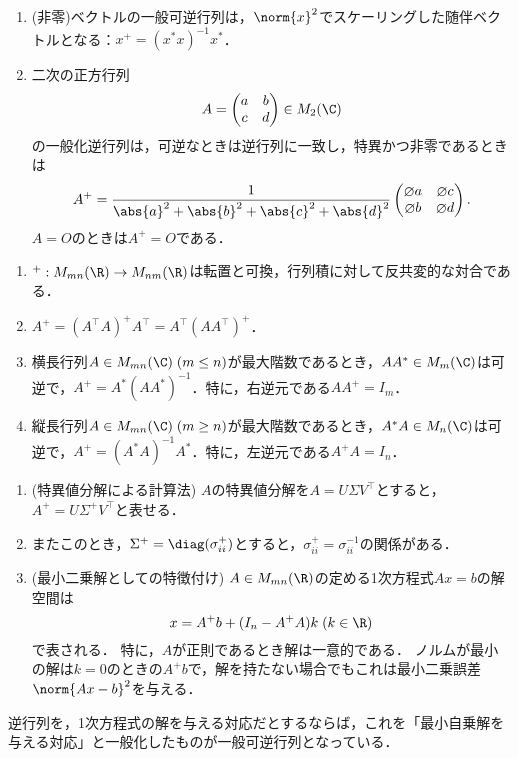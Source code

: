\documentclass[uplatex, dvipdfmx]{jsreport}
\begin{document}
\begin{example}\mbox{}
    \begin{enumerate}
        \item (非零)ベクトルの一般可逆行列は，$\norm{x}^2$でスケーリングした随伴ベクトルとなる：$x^+=(x^*x)^{-1}x^*$．
        \item 二次の正方行列\[A=\begin{pmatrix}
            a&b\\c&d
        \end{pmatrix}\in M_2(\C)\]
        の一般化逆行列は，可逆なときは逆行列に一致し，特異かつ非零であるときは
        \[A^+=\frac{1}{\abs{a}^2+\abs{b}^2+\abs{c}^2+\abs{d}^2}\begin{pmatrix}\o{a}&\o{c}\\\o{b}&\o{d}\end{pmatrix}.\]
        $A=O$のときは$A^+=O$である．
    \end{enumerate}
\end{example}

\begin{proposition}\mbox{}
    \begin{enumerate}
        \item ${}^+:M_{mn}(\R)\to M_{nm}(\R)$は転置と可換，行列積に対して反共変的な対合である．
        \item $A^+=(A^\top A)^+A^\top=A^\top(AA^\top)^+$．
        \item 横長行列$A\in M_{mn}(\C)\;(m\le n)$が最大階数であるとき，$AA^*\in M_m(\C)$は可逆で，$A^+=A^*(AA^*)^{-1}$．特に，右逆元である$AA^+=I_m$．
        \item 縦長行列$A\in M_{mn}(\C)\;(m\ge n)$が最大階数であるとき，$A^*A\in M_n(\C)$は可逆で，$A^+=(A^*A)^{-1}A^*$．特に，左逆元である$A^+A=I_n$．
    \end{enumerate}
\end{proposition}

\begin{proposition}\mbox{}
    \begin{enumerate}
        \item (特異値分解による計算法) $A$の特異値分解を$A=U\Sigma V^\top$とすると，$A^+=U\Sigma^+V^\top$と表せる．
        \item またこのとき，$\Sigma^+=\diag(\sigma_{ii}^+)$とすると，$\sigma_{ii}^+=\sigma_{ii}^{-1}$の関係がある．
        \item (最小二乗解としての特徴付け) $A\in M_{mn}(\R)$の定める1次方程式$Ax=b$の解空間は\[x=A^+b+(I_n-A^+A)k\;(k\in\R)\]で表される．
        特に，$A$が正則であるとき解は一意的である．
        ノルムが最小の解は$k=0$のときの$A^+b$で，解を持たない場合でもこれは最小二乗誤差$\norm{Ax-b}^2$を与える．
    \end{enumerate}
\end{proposition}
\begin{remarks}
    逆行列を，1次方程式の解を与える対応だとするならば，これを「最小自乗解を与える対応」と一般化したものが一般可逆行列となっている．
\end{remarks}
\end{document}
